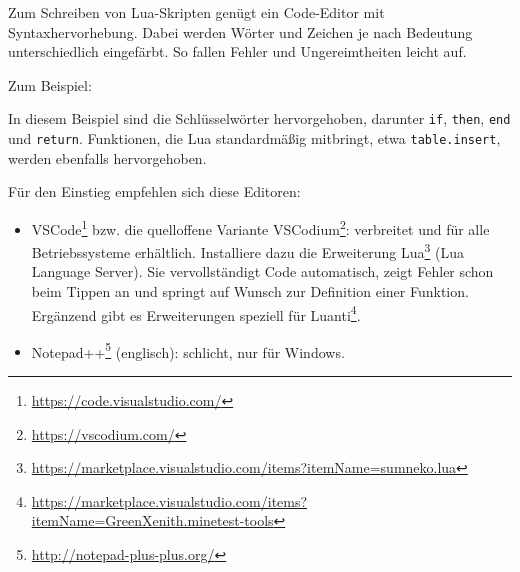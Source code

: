 Zum Schreiben von Lua-Skripten genügt ein Code-Editor mit
Syntaxhervorhebung. Dabei werden Wörter und Zeichen je nach Bedeutung
unterschiedlich eingefärbt. So fallen Fehler und Ungereimtheiten leicht
auf.

Zum Beispiel:

\begin{Shaded}
\begin{Highlighting}[]
 \OperatorTok{(}\OperatorTok{,} \OperatorTok{)}
      \OperatorTok{(}\OperatorTok{)} 
         
      \OperatorTok{(} 
        \OperatorTok{(} \OperatorTok{=} \OperatorTok{\{\}}

    \OperatorTok{(}\OperatorTok{(}\OperatorTok{,} \OperatorTok{,} \OperatorTok{)}
    \OperatorTok{()}

     
\end{Highlighting}
\end{Shaded}

In diesem Beispiel sind die Schlüsselwörter hervorgehoben, darunter
\texttt{if}, \texttt{then}, \texttt{end} und \texttt{return}.
Funktionen, die Lua standardmäßig mitbringt, etwa
\texttt{table.\allowbreak{}insert}, werden ebenfalls hervorgehoben.

Für den Einstieg empfehlen sich diese Editoren:

\begin{itemize}
\tightlist
\item
  VSCode\footnote{\url{https://code.visualstudio.com/}} bzw. die
  quelloffene Variante VSCodium\footnote{\url{https://vscodium.com/}}:
  verbreitet und für alle Betriebssysteme erhältlich. Installiere dazu
  die Erweiterung Lua\footnote{\url{https://marketplace.visualstudio.com/items?itemName=sumneko.lua}}
  (Lua Language Server). Sie vervollständigt Code automatisch, zeigt
  Fehler schon beim Tippen an und springt auf Wunsch zur Definition
  einer Funktion. Ergänzend gibt es Erweiterungen speziell für
  Luanti\footnote{\url{https://marketplace.visualstudio.com/items?itemName=GreenXenith.minetest-tools}}.
\item
  Notepad++\footnote{\url{http://notepad-plus-plus.org/}} (englisch):
  schlicht, nur für Windows.
\end{itemize}

